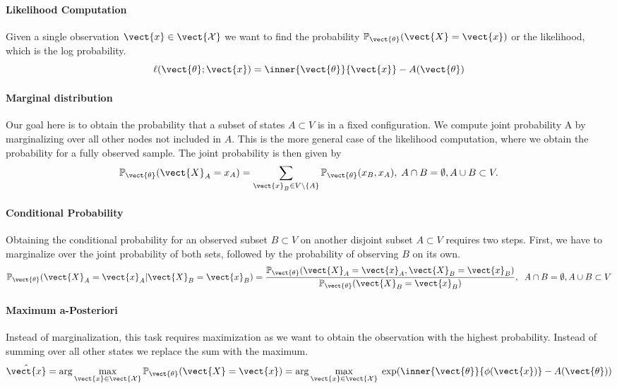\paragraph*{Likelihood Computation}
Given a single observation $\vect{x} \in \vect{\mathcal{X}}$ we want to find the probability  $\mathbb{P}_{\vect{\theta}}(\vect{X} = \vect{x})$ or the likelihood, which is the log probability.
\begin{equation}
    \ell(\vect{\theta}; \vect{x}) = \inner{\vect{\theta}}{\vect{x}} - A(\vect{\theta})
\end{equation}

\paragraph*{Marginal distribution}
Our goal here is to obtain the probability that a subset of states $A \subset V$ is in a fixed configuration.
We compute joint probability \wrt A by marginalizing over all other nodes not included in $A$. 
This is the more general case of the likelihood computation, where we obtain the probability for a fully observed sample.
The joint probability is then given by
    \begin{equation}
        \mathbb{P}_{\vect{\theta}}(\vect{X}_A = x_A) = \sum_{\vect{x}_B \in V \setminus\{A\}} \mathbb{P}_{\vect{\theta}}(x_B , x_A), \; A \cap B = \emptyset, A \cup B \subset V.
    \end{equation}

\paragraph*{Conditional Probability}
Obtaining the conditional probability for an observed subset $B \subset V$ on another disjoint subset $A \subset V$ requires two steps. First, we have to marginalize over the joint probability of both sets, followed by the probability of observing $B$ on its own.
    \begin{equation}
        \mathbb{P}_{\vect{\theta}}(\vect{X}_A = \vect{x}_A \lvert \vect{X}_B = \vect{x}_B) = \frac{\mathbb{P}_{\vect{\theta}}(\vect{X}_A = \vect{x}_A , \vect{X}_B = \vect{x}_B)}{\mathbb{P}_{\vect{\theta}}(\vect{X}_B = \vect{x}_B)}, \;\; A \cap B = \emptyset, A \cup B \subset V
    \end{equation}

\paragraph*{Maximum a-Posteriori}
Instead of marginalization, this task requires maximization as we want to obtain the observation with the highest probability. 
Instead of summing over all other states we replace the sum with the maximum.
\begin{equation}
    \label{eq:map}
    \hat{\vect{x}} = \arg\max_{\vect{x} \in \vect{\mathcal{X}}} \mathbb{P}_{\vect{\theta}}(\vect{X} = \vect{x}) = \arg\max_{\vect{x} \in \vect{\mathcal{X}}} \; \exp(\inner{\vect{\theta}}{\phi(\vect{x})} - A(\vect{\theta}))
\end{equation}

